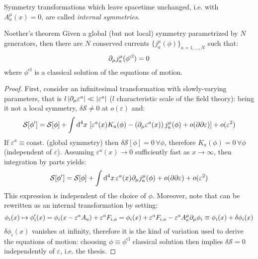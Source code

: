 Symmetry transformations which leave spacetime unchanged, i.e. with $ A^\mu_a(x) = 0 $, are called \textit{internal symmetries}.

\begin{theorem}{Noether's theorem}{}
  Given a global (but not local) symmetry parametrized by $ N $ generators, then there are $ N $ conserved currents $ \{j^\mu_a(\phi)\}_{a = 1, \dots, N} $ such that:
  \begin{equation}
    \partial_\mu j^\mu_a(\phi^\mathrm{cl}) = 0
  \end{equation}
  where $ \phi^\mathrm{cl} $ is a classical solution of the equations of motion.
\end{theorem}

\begin{proofbox}
  \begin{proof}
    First, consider an infinitesimal transformation with slowly-varying parameters, that is $ l \left\lvert\partial_\mu \varepsilon^a\right\rvert \ll \left\lvert\varepsilon^a\right\rvert $ ($ l $ characteristic scale of the field theory): being it not a local symmetry, $ \delta \mathcal{S} \neq 0 $ at $ o(\varepsilon) $ and:
    \begin{equation*}
      \mathcal{S}[\phi'] = \mathcal{S}[\phi] + \int \mathrm{d}^4 x\, \left[ \varepsilon^a(x) K_a(\phi) - \left( \partial_\mu \varepsilon^a(x) \right) j^\mu_a(\phi) + o(\partial \partial \varepsilon) \right] + o(\varepsilon^2)
    \end{equation*}
    If $ \varepsilon^a \equiv \mathrm{const.} $ (global symmetry) then $ \delta \mathcal{S}[\phi] = 0 \,\forall \phi $, therefore $ K_a(\phi) = 0 \,\forall \phi $ (independent of $ \varepsilon $). Assuming $ \varepsilon^a(x) \rightarrow 0 $ sufficiently fast as $ x \rightarrow \infty $, then integration by parts yields:
    \begin{equation*}
      \mathcal{S}[\phi'] = \mathcal{S}[\phi] + \int \mathrm{d}^4 x\, \varepsilon^a(x) \partial_\mu j^\mu_a(\phi) + o(\partial \partial \varepsilon) + o(\varepsilon^2)
    \end{equation*}
    This expression is independent of the choice of $ \phi $. Moreover, note that  can be rewritten as an internal transformation by setting:
    \begin{equation*}
      \phi_i(x) \mapsto \phi'_i(x) = \phi_i(x - \varepsilon^a A_a) + \varepsilon^a F_{i,a} = \phi_i(x) + \varepsilon^a F_{i,a} - \varepsilon^a A^\mu_a \partial_\mu \phi_i \equiv \phi_i(x) + \delta \phi_i(x)
    \end{equation*}
    $ \delta \phi_i(x) $ vanishes at infinity, therefore it is the kind of variation used to derive the equations of motion: choosing $ \phi \equiv \phi^\mathrm{cl} $ classical solution then implies $ \delta \mathcal{S} = 0 $ independently of $ \varepsilon $, i.e. the thesis.
  \end{proof}
\end{proofbox}

